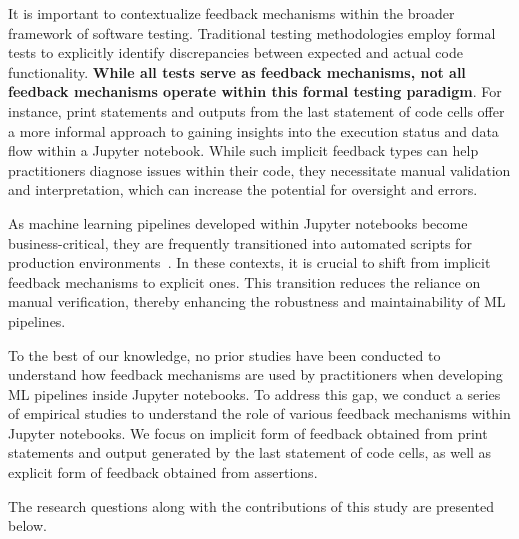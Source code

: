 \documentclass[smallextended]{svjour3}       %
\begin{document}
It is important to contextualize feedback mechanisms within the broader framework of software testing. Traditional testing methodologies employ formal tests to explicitly identify discrepancies between expected and actual code functionality. \textbf{While all tests serve as feedback mechanisms, not all feedback mechanisms operate within this formal testing paradigm}. For instance, print statements and outputs from the last statement of code cells offer a more informal approach to gaining insights into the execution status and data flow within a Jupyter notebook. While such implicit feedback types can help practitioners diagnose issues within their code, they necessitate manual validation and interpretation, which can increase the potential for oversight and errors.

As machine learning pipelines developed within Jupyter notebooks become business-critical, they are frequently transitioned into automated scripts for production environments~\citep{kery2018story,rule2018exploration}. In these contexts, it is crucial to shift from implicit feedback mechanisms to explicit ones. This transition reduces the reliance on manual verification, thereby enhancing the robustness and maintainability of ML pipelines.

To the best of our knowledge, no prior studies have been conducted to understand how feedback mechanisms are used by practitioners when developing ML pipelines inside Jupyter notebooks. To address this gap, we conduct a series of empirical studies to understand the role of various feedback mechanisms within Jupyter notebooks. We focus on implicit form of feedback obtained from print statements and output generated by the last statement of code cells, as well as explicit form of feedback obtained from assertions.

The research questions along with the contributions of this study are presented below.
\end{document}

